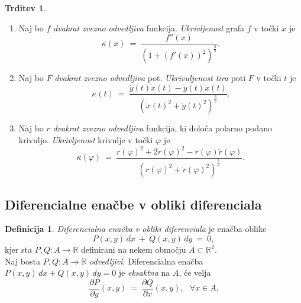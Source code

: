 \documentclass[11pt]{article}
\theoremstyle{definition}
\newtheorem{definicija}{Definicija}[section]
\theoremstyle{definition}
\newtheorem{trditev}{Trditev}[section]
\theoremstyle{definition}
\theoremstyle{theorem}
\begin{document}
\begin{trditev}
~
\begin{enumerate}

	\item[(1)] Naj bo $f$ \textit{dvakrat zvezno odvedljiva} funkcija. \textit{Ukrivljenost} grafa $f$ v točki $x$ je
	$$\kappa(x) ~=~ \frac{f''(x)}{(1+(f'(x))^2)^\frac{3}{2}}.$$
	
	\item[(2)] Naj bo $F$ \textit{dvakrat zvezno odvedljiva} pot. \textit{Ukrivuljenost tira} poti $F$ v točki $t$ je
	$$\kappa(t) ~=~ \frac{\ddot{y}(t) \dot{x}(t) - \dot{y}(t) \ddot{x}(t)}{(\dot{x}(t)^2 + \dot{y}(t)^2)^\frac{3}{2}}.$$
	
	\item[(3)] Naj  bo $r$ \textit{dvakrat zvezno odvedljiva} funkcija, ki določa polarno podano krivuljo. \textit{Ukrivljenost} krivulje v točki $\varphi$ je
	$$\kappa(\varphi) ~=~ \frac{r(\varphi)^2 + 2\dot{r}(\varphi)^2 - r(\varphi)\ddot{r}(\varphi)}{(r(\varphi)^2 + \dot{r}(\varphi)^2)^\frac{3}{2}}.$$

\end{enumerate}

\end{trditev}
\vspace{0.5cm}


\subsection{Diferencialne enačbe v obliki diferenciala}
\vspace{0.5cm}

\begin{definicija}

\textit{Diferencialna enačba v obliki diferenciala} je enačba oblike 
$$P(x, y)\,dx ~+~ Q(x, y)\,dy ~=~ 0,$$
kjer sta $P, Q: A \rightarrow \mathbb{R}$ definirani na nekem območju $A \subset \mathbb{R}^2$. \\

\noindent Naj bosta $P, Q: A \rightarrow \mathbb{R}$ \textit{odvedljivi}. Diferencialna enačba \\$P(x, y)\,dx + Q(x, y)\,dy = 0$ je \textit{eksaktna} na $A$, če velja 
$$\frac{\partial P}{\partial y}(x, y) ~=~ \frac{\partial Q}{\partial x}(x, y), ~~~\forall x \in A.$$

\end{definicija}
\vspace{0.5cm}
\end{document}
